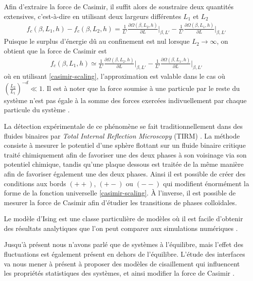 Afin d'extraire la force de Casimir, il suffit alors de soustraire deux quantités extensives, c'est-à-dire en utilisant deux largeurs différentes $L_1$ et $L_2$
\begin{align}
    f_c(\beta,L_1,h) - f_c(\beta,L_2,h) =  \frac{1}{L' }\frac{\partial \Omega(\beta,L_2,h)}{\partial L} \bigg|_{\beta,L'} -  \frac{1}{L' }\frac{\partial \Omega(\beta,L_1,h)}{\partial L} \bigg|_{\beta,L'}
\end{align}
Puisque le surplus d'énergie dû au confinement est nul lorsque $L_2\to \infty$, on obtient que la force de Casimir est
\begin{align}
    f_c(\beta,L_1,h) \simeq \frac{1}{L' }\frac{\partial \Omega(\beta,L_2,h)}{\partial L} \bigg|_{\beta,L'} -  \frac{1}{L' }\frac{\partial \Omega(\beta,L_1,h)}{\partial L} \bigg|_{\beta,L'}
\end{align}
où en utilisant \ref{casimir-scaling}, l'approximation est valable dans le cas où $ \left( \frac{L_2}{L_1}\right)^{-d} \ll 1 $.  Il est à noter que la force soumise à une particule par le reste du système n'est pas égale à la somme des forces exercées indivuellement par chaque particule du système \cite{paladugu_nonadditivity_2016}.

La détection expérimentale de ce phénomène se fait traditionnellement dans des fluides binaires par \textit{Total Internal Reflection Microscopy} (TIRM) \cite{fukuto_critical_2005,hertlein_direct_2008,gambassi_critical_2009,edison_critical_2015-1}. La méthode consiste à mesurer le potentiel d'une sphère flottant sur un fluide binaire critique traité chimiquement afin de favoriser une des deux phases à son voisinage via son potentiel chimique, tandis qu'une plaque dessous est traitée de la même manière afin de favoriser également une des deux phases. Ainsi il est possible de créer des conditions aux bords $(++)$, $(+-)$ ou $(--)$ qui modifient énormément la forme de la fonction universelle \ref{casimir-scaling}. À l'inverse, il est possible de mesurer la force de Casimir \cite{nguyen_controlling_2013} afin d'étudier les transitions de phases colloïdales.

Le modèle d'Ising est une classe particulière de modèles où il est facile d'obtenir des résultats analytiques \cite{hobrecht_critical_2017} que l'on peut comparer aux simulations numériques \cite{vasilyev_monte_2007,vasilyev_universal_2009,cardozo_finite_2015}.

Jusqu'à présent nous n'avons parlé que de systèmes à l'équilibre, mais l'effet des fluctuations est également présent en dehors de l'équilibre. L'étude des interfaces va nous mener à présent à proposer des modèles de cisaillement qui influencent les propriétés statistiques des systèmes, et ainsi modifier la force de Casimir \cite{dean_out--equilibrium_2010}.

